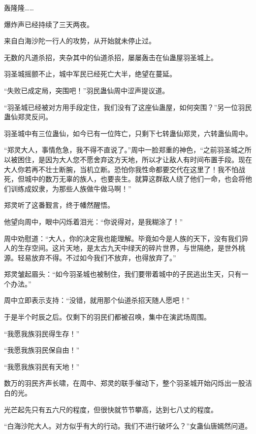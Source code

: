 
\begin{this_body}



轰隆隆……

爆炸声已经持续了三天两夜。

来自白海沙陀一行人的攻势，从开始就未停止过。

无数的凡道杀招，夹杂其中的仙道杀招，屡屡轰击在仙蛊屋羽圣城上。

羽圣城摇颤不止，城中军民已经死亡大半，绝望在蔓延。

“失败已成定局，突围吧！”羽民蛊仙周中涩声提议道。

“羽圣城已经被对方用手段定住，我们没有了这座仙蛊屋，如何突围？”另一位羽民蛊仙郑灵反问。

羽圣城中有三位蛊仙，如今已有一位阵亡，只剩下七转蛊仙郑灵，六转蛊仙周中。

“郑灵大人，事情危急，我不得不直说了。”周中一脸郑重的神色，“之前羽圣城之所以被困住，是因为大人您不愿舍弃这方天地，所以才让敌人有时间布置手段。现在大人你若再不壮士断腕，当机立断。恐怕你我性命都要交代在这里了！我不怕战死，但城中的数万无辜的族人，也要丧生。就算这群敌人绕了他们一命，也会将他们训练成奴隶，为那些人族做牛做马啊！”

郑灵听了这番觐言，终于幡然醒悟。

他望向周中，眼中闪烁着泪光：“你说得对，是我糊涂了！”

周中劝慰道：“大人，你的决定我也能理解。毕竟如今是人族的天下，没有我们异人的生存空间。这片天地，是太古九天中绿天的碎片世界，与世隔绝，是世外桃源。轻易放弃不得。不过如今我们不放弃，也得放弃了。”

郑灵皱起眉头：“如今羽圣城也被制住，我们要带着城中的子民逃出生天，只有一个办法。”

周中立即表示支持：“没错，就用那个仙道杀招天随人愿吧！”

于是半个时辰之后。仅剩下的羽民们都被召唤，集中在演武场周围。

“我愿我族羽民得生存！”

“我愿我族羽民保自由！”

“我愿我族羽民有天地！”

数万的羽民齐声长啸，在周中、郑灵的联手催动下，整个羽圣城开始闪烁出一股洁白的光。

光芒起先只有五六尺的程度，但很快就节节攀高，达到七八丈的程度。

“白海沙陀大人。对方似乎有大的行动。我们不进行破坏么？”女蛊仙唐嫣然问道。


\end{this_body}
